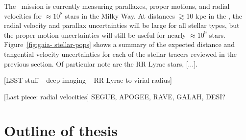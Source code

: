 The \gaia\ mission is currently measuring parallaxes, proper motions, and radial
velocities for $\approx$$10^{8}$ stars in the Milky Way. At distances
$\gtrsim$10 kpc in the \mwhalo, the radial velocity and parallax uncertainties
will be large for all stellar types, but the proper motion uncertainties will
still be useful for nearly $\approx$$10^{9}$ stars. Figure~\ref{fig:gaia-
stellar-pops} shows a summary of the expected distance and tangential velocity
uncertainties for each of the stellar tracers reviewed in the previous section.
 Of particular note are the RR Lyrae stars, [...].

[LSST stuff -- deep imaging -- RR Lyrae to virial radius]

[Last piece: radial velocities]
SEGUE, APOGEE, RAVE, GALAH, DESI?

\section{Outline of thesis}

